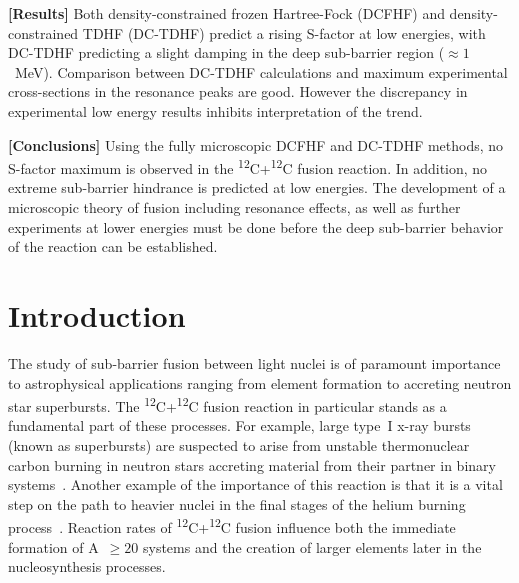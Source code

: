 		{\bf [Results]} Both density-constrained frozen Hartree-Fock (DCFHF) and density-constrained TDHF (DC-TDHF) predict a rising S-factor at low energies, with DC-TDHF predicting a slight damping in the deep sub-barrier region ($\approx1$~MeV). Comparison between  DC-TDHF calculations and maximum experimental cross-sections in the resonance peaks are good. However the discrepancy in experimental low energy results inhibits interpretation of the trend.
		
		{\bf [Conclusions]} Using the fully microscopic DCFHF and DC-TDHF methods, no S-factor maximum is observed in the \textsuperscript{12}C+\textsuperscript{12}C fusion reaction. In addition, no extreme sub-barrier hindrance is predicted at low energies. The development of a microscopic theory of fusion including resonance effects, as well as further experiments at lower energies must be done before the deep sub-barrier behavior of the reaction can be established. 


\section{Introduction}
\label{sec:intro}
The study of sub-barrier fusion between light nuclei is of paramount importance to astrophysical applications ranging from element formation to accreting neutron star superbursts.
The \textsuperscript{12}C+\textsuperscript{12}C fusion reaction in particular stands as a fundamental part of these processes.
For example, large type~I x-ray bursts (known as superbursts) are suspected to arise from unstable thermonuclear carbon burning in neutron stars accreting material from their partner in binary systems~\citep{cumming2001,strohmayer2002}.
Another example of the importance of this reaction is that it is  a vital step on the path to heavier nuclei in the final stages of the helium burning process~\citep{hoyle1954}.
Reaction rates of \textsuperscript{12}C+\textsuperscript{12}C fusion influence both the immediate formation of A~$\geq 20$ systems and the creation of larger elements later in the nucleosynthesis processes.

